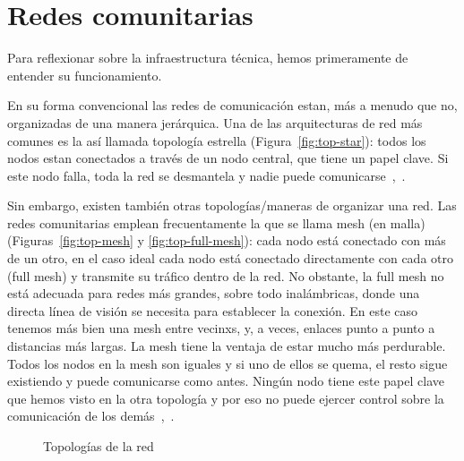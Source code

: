 \section{Redes comunitarias}
\label{cap:redes}

Para reflexionar sobre la infraestructura técnica, hemos primeramente de entender su funcionamiento.

En su forma convencional las redes de comunicación estan, más a menudo que no, organizadas de una manera jerárquica.
Una de las arquitecturas de red más comunes es la así llamada topología estrella (Figura~\vref{fig:top-star}):
todos los nodos estan conectados a través de un nodo central, que tiene un papel clave.
Si este nodo falla, toda la red se desmantela y nadie puede comunicarse~\autocite{Mabb2014},~\autocite{Medosch2004}.

Sin embargo, existen también otras topologías/maneras de organizar una red.
Las redes comunitarias emplean frecuentamente la que se llama mesh (en malla) (Figuras~\vref{fig:top-mesh} y \vref{fig:top-full-mesh}):
cada nodo está conectado con más de un otro, en el caso ideal cada nodo está conectado directamente con cada otro (full mesh) y transmite su tráfico dentro de la red.
No obstante, la full mesh no está adecuada para redes más grandes, sobre todo inalámbricas, donde una directa línea de visión se necesita para establecer la conexión.
En este caso tenemos más bien una mesh entre vecinxs, y, a veces, enlaces punto a punto a distancias más largas.
La mesh tiene la ventaja de estar mucho más perdurable.
Todos los nodos en la mesh son iguales y si uno de ellos se quema, el resto sigue existiendo y puede comunicarse como antes.
Ningún nodo tiene este papel clave que hemos visto en la otra topología y por eso no puede ejercer control sobre la comunicación de los demás~\autocite{FiTre2015},~\autocite{Medosch2004}.

\begin{figure}[b]
\centering
{} \quad
{} \quad
{}
\caption[Topologies]{Topologías de la red} %
\label{fig:topologies}
\end{figure}

